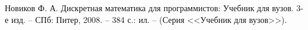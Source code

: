 \documentclass[a4paper,12pt]{article} %
\begin{document}

\setcounter{page}{2}
\tableofcontents
\newpage


\begin{thebibliography}{100}
	 Новиков Ф. А. Дискретная математика для программистов: Учебник для вузов. 3-е изд. -- СПб: Питер, 2008. -- 384 с.: ил. -- (Серия <<Учебник для вузов>>).
\end{thebibliography}
\end{document}
